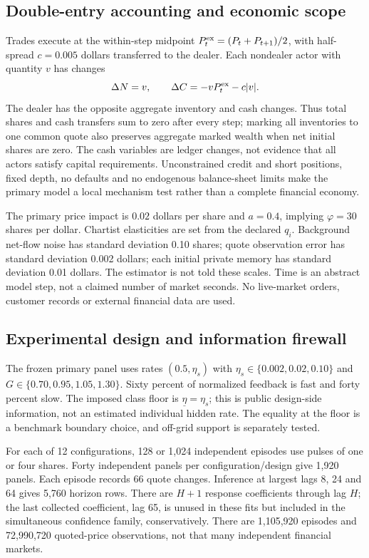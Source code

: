 \documentclass[11pt,a4paper]{article}
\theoremstyle{definition}
\theoremstyle{remark}
\begin{document}
\subsection{Double-entry accounting and economic scope}
Trades execute at the within-step midpoint $P_t^{\rm ex}=(P_t+P_{t+1})/2$, with half-spread $c=0.005$ dollars transferred to the dealer. Each nondealer actor with quantity $v$ has changes
\[
 \Delta N=v,\qquad \Delta C=-vP_t^{\rm ex}-c|v|.
\]
The dealer has the opposite aggregate inventory and cash changes. Thus total shares and cash transfers sum to zero after every step; marking all inventories to one common quote also preserves aggregate marked wealth when net initial shares are zero. The cash variables are ledger changes, not evidence that all actors satisfy capital requirements. Unconstrained credit and short positions, fixed depth, no defaults and no endogenous balance-sheet limits make the primary model a local mechanism test rather than a complete financial economy.

The primary price impact is $0.02$ dollars per share and $a=0.4$, implying $\varphi=30$ shares per dollar. Chartist elasticities are set from the declared $q_i$. Background net-flow noise has standard deviation 0.10 shares; quote observation error has standard deviation 0.002 dollars; each initial private memory has standard deviation 0.01 dollars. The estimator is not told these scales. Time is an abstract model step, not a claimed number of market seconds. No live-market orders, customer records or external financial data are used.

\subsection{Experimental design and information firewall}
The frozen primary panel uses rates $(0.5,\eta_s)$ with $\eta_s\in\{0.002,0.02,0.10\}$ and $G\in\{0.70,0.95,1.05,1.30\}$. Sixty percent of normalized feedback is fast and forty percent slow. The imposed class floor is $\underline\eta=\eta_s$; this is public design-side information, not an estimated individual hidden rate. The equality at the floor is a benchmark boundary choice, and off-grid support is separately tested.

For each of 12 configurations, 128 or 1,024 independent episodes use pulses of one or four shares. Forty independent panels per configuration/design give 1,920 panels. Each episode records 66 quote changes. Inference at largest lags 8, 24 and 64 gives 5,760 horizon rows. There are $H+1$ response coefficients through lag $H$; the last collected coefficient, lag 65, is unused in these fits but included in the simultaneous confidence family, conservatively. There are 1,105,920 episodes and 72,990,720 quoted-price observations, not that many independent financial markets.
\end{document}
